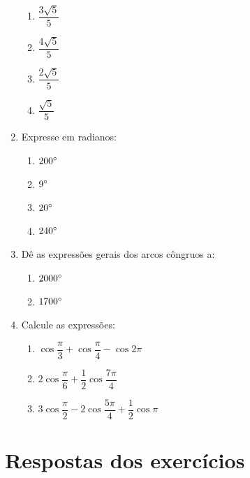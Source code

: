 \begin{enumerate}
        \begin{enumerate}
            \item   $\dfrac{3\sqrt{5}}{5}$
            \item   $\dfrac{4\sqrt{5}}{5}$
            \item   $\dfrac{2\sqrt{5}}{5}$
            \item   $\dfrac{\sqrt{5}}{5}$
        \end{enumerate}
    \item   Expresse em radianos:
        \begin{enumerate}
            \item $200 \degree$
            \item $9 \degree$
            \item $20 \degree$
            \item $240 \degree$
        \end{enumerate}
    \item   Dê as expressões gerais dos arcos côngruos a:
        \begin{enumerate}
            \item   $2000 \degree$
            \item   $1700 \degree$
        \end{enumerate}
    \item   Calcule as expressões:
        \begin{enumerate}
            \item   $\cos \dfrac{\pi}{3} + \cos \dfrac{\pi}{4} - \cos 2\pi$
            \item   $2 \cos \dfrac{\pi}{6} + \dfrac{1}{2} \cos \dfrac{7\pi}{4}$
            \item   $3 \cos \dfrac{\pi}{2} - 2 \cos \dfrac{5\pi}{4} + \dfrac{1}{2} \cos \pi$
        \end{enumerate}
 \end{enumerate}

 \section{Respostas dos exercícios}

